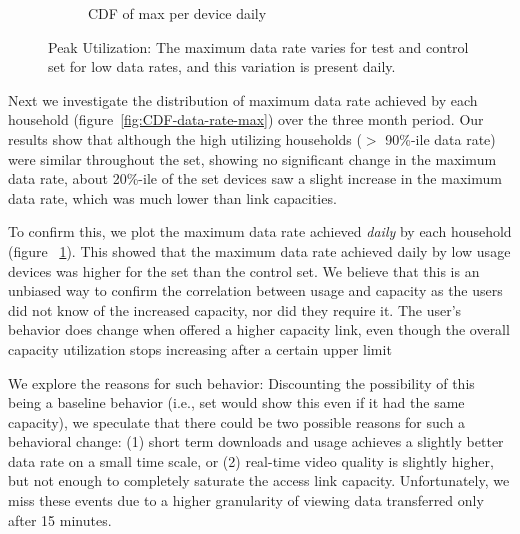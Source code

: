 \begin{figure}[ht!]
\begin{minipage}{0.90\linewidth}
\begin{subfigure}[b]{0.90\linewidth}
  \caption{CDF of max per device daily}
  \vspace{1em}
  \label{fig:CDF-data-rate-max-daily}
\end{subfigure}
\end{minipage}
\caption{Peak Utilization: The maximum data rate varies for test and control set for low data rates, and this variation is present daily.}
\label{fig:peak-utilization}
\end{figure}

Next we investigate the distribution of maximum data rate achieved by each household (figure~\ref{fig:CDF-data-rate-max}) over the three month period. Our results show that although the high utilizing households ($>$ 90\%-ile data rate) were similar throughout the set, showing no significant change in the maximum data rate, about 20\%-ile of the \test set devices saw a slight increase in the maximum data rate, which was much lower than link capacities. 

To confirm this, we plot the maximum data rate achieved \emph{daily} by each household (figure ~\ref{fig:CDF-data-rate-max-daily}). This showed that the maximum data rate achieved daily by low usage devices was higher for the \test set than the control set. We believe that this is an unbiased way to confirm the correlation between usage and capacity as the users did not know of the increased capacity, nor did they require it. The user's behavior does change when offered a higher capacity link, even though the overall capacity utilization stops increasing after a certain upper limit

We explore the reasons for such behavior: Discounting the possibility of this being a baseline behavior (i.e., \test set would show this even if it had the same capacity), we speculate that there could be two possible reasons for such a behavioral change: (1) short term downloads and usage achieves a slightly better data rate on a small time scale, or (2) real-time video quality is slightly higher, but not enough to completely saturate the access link capacity. Unfortunately, we miss these events due to a higher granularity of viewing data transferred only after 15 minutes.

